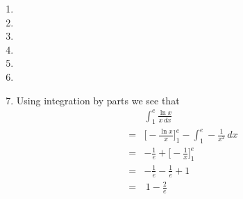 \documentclass{article}
\begin{document}
\begin{enumerate}
    It is then easy to compute that \(g''(\pi/2)=\frac{2(5^4)-3(5^2)}{5^4}>0\) implying a minimum. We also have
    \[
    g''(3\pi/2) = 0
    \]
    which we note, and return to later. Then
    \[
    g''(\pi/6) = g''(5\pi/6) = \frac{3(11/2)^2-3(11/2)^4}{(11/2)^4}>0
    \]
    again giving us two minimums.

    We now return to the case of \(x=\pi/6\). To examine this, we look at the first derivative and find that the sign of \(g'\) depends on the sign of \(f'\) and \(f^2-1\) only. For \(\epsilon>0\) sufficiently small, we see that 
    \[
    f'(\pi/6\pm\epsilon) = 2\cos\Big(\frac{\pi}{6}\pm\epsilon\Big)\bigg(1-\sin \Big(\frac{\pi}{6} \pm \epsilon\Big)\bigg)>0.
    \]
    Then, 
    \[
    f^2\Big(\frac{\pi}{6}\Big)-1 = \Big(\frac{11}{2}\Big)^2 - 1 >0
    \]
    and so \(f^2 -1\) remains positive in some neighbourhood around \(\pi/6\). Thus \(g'\) remains positive in this region too and so we have a point of inflection.

    \textit{We have 3 minimia and 1 point of inflection - something must definitely have gone wrong here. Actually, it could be due to there being asymptotes when \(f=0\)}.
    \item 
    \item 
    \item 
    \item 
    \item 
    \item 
    \item Using integration by parts we see that
    \begin{align*}
        &\int_1^e \frac{\ln x}{x \, dx} \\
        = &\Big[ - \frac{\ln x}{x} \Big]_1^e - \int_1^e - \frac{1}{x^2} \, dx \\
        = &- \frac{1}{e} + \Big[ -\frac{1}{x}\Big]_1^e \\
        = &-\frac{1}{e}-\frac{1}{e}+1 \\
        = &\,1-\frac{2}{e}
    \end{align*}


\end{enumerate}
\end{document}
